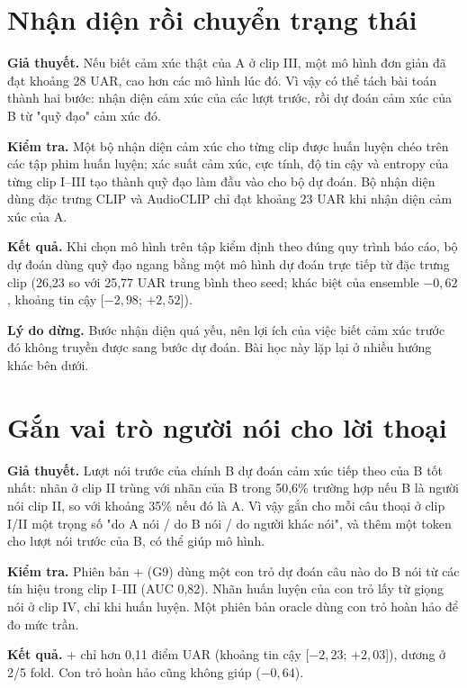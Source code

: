 \section{Nhận diện rồi chuyển trạng thái}

\textbf{Giả thuyết.} Nếu biết cảm xúc thật của A ở clip III, một mô hình đơn giản đã đạt khoảng 28 UAR, cao hơn các mô hình lúc đó. Vì vậy có thể tách bài toán thành hai bước: nhận diện cảm xúc của các lượt trước, rồi dự đoán cảm xúc của B từ "quỹ đạo" cảm xúc đó.

\textbf{Kiểm tra.} Một bộ nhận diện cảm xúc cho từng clip được huấn luyện chéo trên các tập phim huấn luyện; xác suất cảm xúc, cực tính, độ tin cậy và entropy của từng clip I--III tạo thành quỹ đạo làm đầu vào cho bộ dự đoán. Bộ nhận diện dùng đặc trưng CLIP và AudioCLIP chỉ đạt khoảng 23 UAR khi nhận diện cảm xúc của A.

\textbf{Kết quả.} Khi chọn mô hình trên tập kiểm định theo đúng quy trình báo cáo, bộ dự đoán dùng quỹ đạo ngang bằng một mô hình dự đoán trực tiếp từ đặc trưng clip (26,23 so với 25,77 UAR trung bình theo seed; khác biệt của ensemble $-0{,}62$, khoảng tin cậy [$-2{,}98$; $+2{,}52$]).

\textbf{Lý do dừng.} Bước nhận diện quá yếu, nên lợi ích của việc biết cảm xúc trước đó không truyền được sang bước dự đoán. Bài học này lặp lại ở nhiều hướng khác bên dưới.

\section{Gắn vai trò người nói cho lời thoại}

\textbf{Giả thuyết.} Lượt nói trước của chính B dự đoán cảm xúc tiếp theo của B tốt nhất: nhãn ở clip II trùng với nhãn của B trong 50,6\% trường hợp nếu B là người nói clip II, so với khoảng 35\% nếu đó là A. Vì vậy gắn cho mỗi câu thoại ở clip I/II một trọng số "do A nói / do B nói / do người khác nói", và thêm một token cho lượt nói trước của B, có thể giúp mô hình.

\textbf{Kiểm tra.} Phiên bản \model{}+ (G9) dùng một con trỏ dự đoán câu nào do B nói từ các tín hiệu trong clip I--III (AUC 0,82). Nhãn huấn luyện của con trỏ lấy từ giọng nói ở clip IV, chỉ khi huấn luyện. Một phiên bản oracle dùng con trỏ hoàn hảo để đo mức trần.

\textbf{Kết quả.} \model{}+ chỉ hơn \model{} 0,11 điểm UAR (khoảng tin cậy [$-2{,}23$; $+2{,}03$]), dương ở 2/5 fold. Con trỏ hoàn hảo cũng không giúp ($-0{,}64$).

